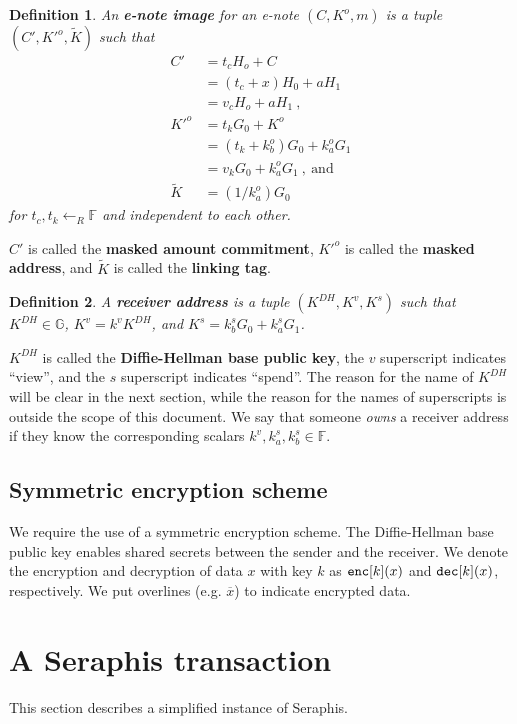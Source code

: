 \documentclass{article}
\newtheorem{definition}{Definition}[section]
\begin{document}
\begin{definition}\label{e-note-img}
An \textbf{\em e-note image} for an e-note $(C, K^o, m)$ is a tuple $(C', K'^o, \tilde{K})$ such that
\begin{align*}
C' &= t_c H_o + C \\ &= (t_c+x)H_0 + aH_1 \\ &= v_c H_o + aH_1 \ , \\
K'^o &= t_k G_0 + K^o \\ &= (t_k + k_b^o) G_0 + k_a^o G_1 \\ &= v_k G_0 + k_a^o G_1 \ ,\ \text{and} \\
\tilde{K} &= (1/k_a^o)G_0
\end{align*}
for $t_c, t_k \leftarrow_R\mathbb{F}$ and independent to each other.
\end{definition}
$C'$ is called the \textbf{masked amount commitment}, $K'^o$ is called the \textbf{masked address}, and $\tilde{K}$ is called the \textbf{linking tag}.

\begin{definition}\label{recv-addr}
A \textbf{\em receiver address} is a tuple $(K^{DH}, K^v, K^s)$  such that $K^{DH}\in\mathbb{G}$, $K^v = k^v K^{DH}$, and $K^s = k_b^s G_0 + k_a^s G_1$.
\end{definition}
$K^{DH}$ is called the \textbf{Diffie-Hellman base public key}, the $v$ superscript indicates ``view'', and the $s$ superscript indicates ``spend''. The reason for the name of $K^{DH}$ will be clear in the next section, while the reason for the names of superscripts is outside the scope of this document. We say that someone \textit{owns} a receiver address if they know the corresponding scalars $k^v, k_a^s, k_b^s \in\mathbb{F}$.

\subsection{Symmetric encryption scheme}
We require the use of a symmetric encryption scheme. The Diffie-Hellman base public key enables shared secrets between the sender and the receiver. We denote the encryption and decryption of data $x$ with key $k$ as ${\tt enc}[k](x)$ and ${\tt dec}[k](x)$, respectively. We put overlines (e.g. $\overline{x}$) to indicate encrypted data.

\section{A Seraphis transaction}
\noindent This section describes a simplified instance of Seraphis.
\end{document}
